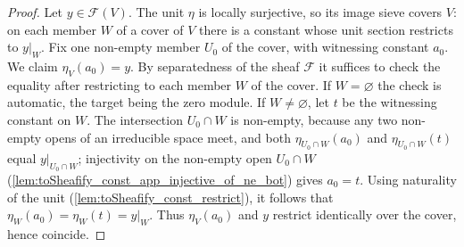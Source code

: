 \begin{proof}\leanok
  Let \(y \in \mathcal F(V)\). The unit \(\eta\) is locally surjective, so
  its image sieve covers \(V\): on each member \(W\) of a cover of \(V\)
  there is a constant whose unit section restricts to \(y|_W\). Fix one
  non-empty member \(U_0\) of the cover, with witnessing constant
  \(a_0\). We claim \(\eta_V(a_0) = y\). By separatedness of the sheaf
  \(\mathcal F\) it suffices to check the equality after restricting to
  each member \(W\) of the cover. If \(W = \varnothing\) the check is
  automatic, the target being the zero module. If \(W \neq \varnothing\),
  let \(t\) be the witnessing constant on \(W\). The intersection
  \(U_0 \cap W\) is non-empty, because any two non-empty opens of an
  irreducible space meet, and both \(\eta_{U_0 \cap W}(a_0)\) and
  \(\eta_{U_0 \cap W}(t)\) equal \(y|_{U_0 \cap W}\); injectivity on the
  non-empty open \(U_0 \cap W\)
  (\cref{lem:toSheafify_const_app_injective_of_ne_bot}) gives
  \(a_0 = t\). Using naturality of the unit
  (\cref{lem:toSheafify_const_restrict}), it follows that
  \(\eta_W(a_0) = \eta_W(t) = y|_W\). Thus \(\eta_V(a_0)\) and \(y\)
  restrict identically over the cover, hence coincide.
\end{proof}

